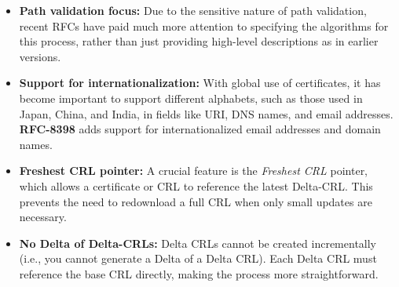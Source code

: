 \begin{itemize}
  \item \textbf{Path validation focus:} Due to the sensitive nature of 
    path validation, recent RFCs have paid much more attention to 
    specifying the algorithms for this process, rather than just 
    providing high-level descriptions as in earlier versions. 
  \item \textbf{Support for internationalization:} With global use of 
    certificates, it has become important to support different 
    alphabets, such as those used in Japan, China, and India, in 
    fields like URI, DNS names, and email addresses. \textbf{RFC-8398} 
    adds support for internationalized email addresses and domain 
    names.
  \item \textbf{Freshest CRL pointer:} A crucial feature is the 
    \emph{Freshest CRL} pointer, which allows a certificate or CRL to 
    reference the latest Delta-CRL. This prevents the need to 
    redownload a full CRL when only small updates are necessary.
  \item \textbf{No Delta of Delta-CRLs:} Delta CRLs cannot be created 
    incrementally (i.e., you cannot generate a Delta of a Delta CRL). 
    Each Delta CRL must reference the base CRL directly, making the 
    process more straightforward.
\end{itemize}

